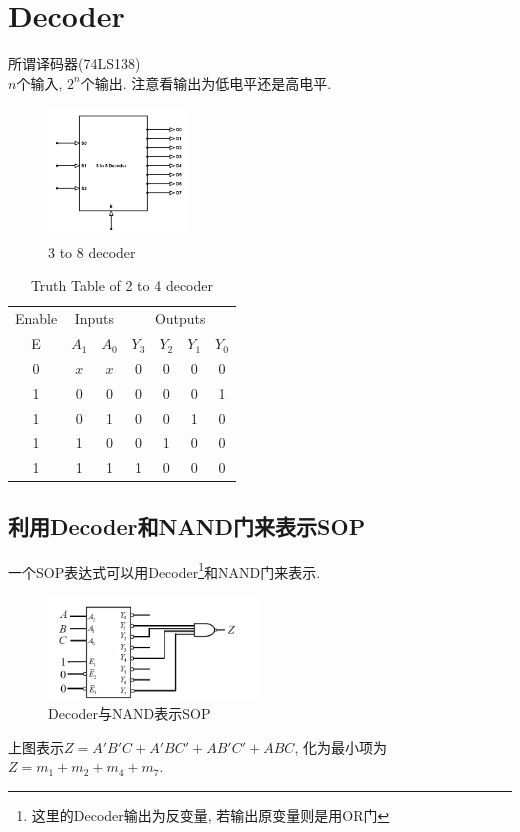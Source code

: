 \documentclass[scheme=chinese,a4paper]{report}
\begin{document}
\section{Decoder}
所谓译码器(74LS138)\\
$n$个输入, $2^n$个输出. 注意看输出为低电平还是高电平. 
\begin{figure}[H]
    \centering
    \includegraphics[width=0.33\textwidth]{decoder-block-diagram.jpg}
    \caption{3 to 8 decoder}
\end{figure} 
\begin{table}[H]
    \centering
    \caption{Truth Table of 2 to 4 decoder}
      \begin{tabular}{c|cc|cccc}
      Enable & \multicolumn{2}{c}{Inputs} & \multicolumn{4}{c}{Outputs} \\
      E     & $A_1$    & $A_0$    & $Y_3$    & $Y_2$    & $Y_1$    & $Y_0$ \\
      0     & $x$     & $x$     & 0     & 0     & 0     & 0 \\
      1     & 0     & 0     & 0     & 0     & 0     & 1 \\
      1     & 0     & 1     & 0     & 0     & 1     & 0 \\
      1     & 1     & 0     & 0     & 1     & 0     & 0 \\
      1     & 1     & 1     & 1     & 0     & 0     & 0 \\
      \end{tabular}%
  \end{table}%
\subsection{利用Decoder和NAND门来表示SOP}
一个SOP表达式可以用Decoder\footnote{这里的Decoder输出为反变量, 若输出原变量则是用OR门}和NAND门来表示. \\

\begin{figure}[H]
\centering
\includegraphics[width=0.5\textwidth]{decoder.png}
\caption{Decoder与NAND表示SOP}
\end{figure}
上图表示$Z=A'B'C+A'BC'+AB'C'+ABC$, 化为最小项为$Z=m_1+m_2+m_4+m_7$. 
\end{document}
